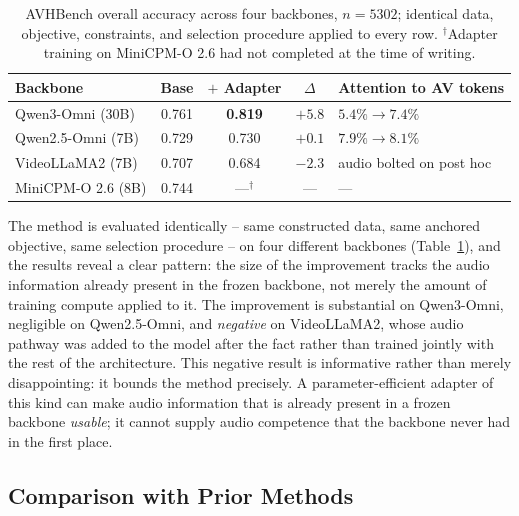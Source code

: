 \documentclass[11pt,a4paper,oneside]{article}
\begin{document}
\begin{table}[h]
\centering
\small
\begin{tabular}{lcccl}
\toprule
Backbone & Base & $+$ Adapter & $\Delta$ & Attention to AV tokens \\
\midrule
Qwen3-Omni (30B)   & 0.761 & \textbf{0.819} & $+5.8$ & $5.4\%\to7.4\%$ \\
Qwen2.5-Omni (7B)  & 0.729 & 0.730 & $+0.1$ & $7.9\%\to8.1\%$ \\
VideoLLaMA2 (7B)   & 0.707 & 0.684 & \textcolor{red!70!black}{$-2.3$} & audio bolted on post hoc \\
MiniCPM-O 2.6 (8B) & 0.744 & ---$^\dagger$ & --- & --- \\
\bottomrule
\end{tabular}
\caption{AVHBench overall accuracy across four backbones, $n=5302$; identical data, objective,
constraints, and selection procedure applied to every row. $^\dagger$Adapter training on MiniCPM-O
2.6 had not completed at the time of writing.}
\label{tab:backbones}
\end{table}

The method is evaluated identically -- same constructed data, same anchored objective, same
selection procedure -- on four different backbones (Table~\ref{tab:backbones}), and the results
reveal a clear pattern: the size of the improvement tracks the audio information already present in
the frozen backbone, not merely the amount of training compute applied to it. The improvement is
substantial on Qwen3-Omni, negligible on Qwen2.5-Omni, and \emph{negative} on VideoLLaMA2, whose audio
pathway was added to the model after the fact rather than trained jointly with the rest of the
architecture. This negative result is informative rather than merely disappointing: it bounds the
method precisely. A parameter-efficient adapter of this kind can make audio information that is
already present in a frozen backbone \emph{usable}; it cannot supply audio competence that the
backbone never had in the first place.

\subsection{Comparison with Prior Methods}
\label{sec:prior-methods}
\end{document}
